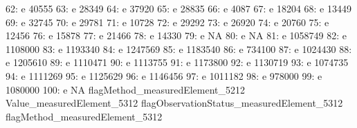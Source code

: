 \documentclass[nojss]{jss}
\begin{document}
\begin{Schunk}
\begin{Soutput}
 62:                               e                      40555
 63:                               e                      28349
 64:                               e                      37920
 65:                               e                      28835
 66:                               e                       4087
 67:                               e                      18204
 68:                               e                      13449
 69:                               e                      32745
 70:                               e                      29781
 71:                               e                      10728
 72:                               e                      29292
 73:                               e                      26920
 74:                               e                      20760
 75:                               e                      12456
 76:                               e                      15878
 77:                               e                      21466
 78:                               e                      14330
 79:                               e                         NA
 80:                               e                         NA
 81:                               e                    1058749
 82:                               e                    1108000
 83:                               e                    1193340
 84:                               e                    1247569
 85:                               e                    1183540
 86:                               e                     734100
 87:                               e                    1024430
 88:                               e                    1205610
 89:                               e                    1110471
 90:                               e                    1113755
 91:                               e                    1173800
 92:                               e                    1130719
 93:                               e                    1074735
 94:                               e                    1111269
 95:                               e                    1125629
 96:                               e                    1146456
 97:                               e                    1011182
 98:                               e                     978000
 99:                               e                    1080000
100:                               e                         NA
     flagMethod_measuredElement_5212 Value_measuredElement_5312
     flagObservationStatus_measuredElement_5312 flagMethod_measuredElement_5312

\end{Soutput}
\end{Schunk}
\end{document}
